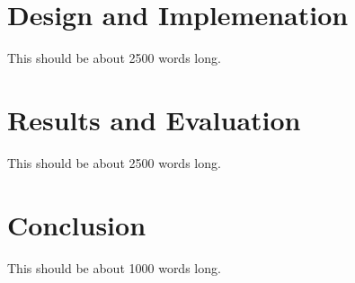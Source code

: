 \documentclass[authoryearcitations]{UoYCSproject}
\begin{document}
\chapter{Design and Implemenation}
\label{cha:Design and Implementation}
This should be about 2500 words long.

\chapter{Results and Evaluation}
\label{cha:Results and Evaluation}
This should be about 2500 words long.

\chapter{Conclusion}
\label{cha:Conclusion}
This should be about 1000 words long.


 
\end{document}

